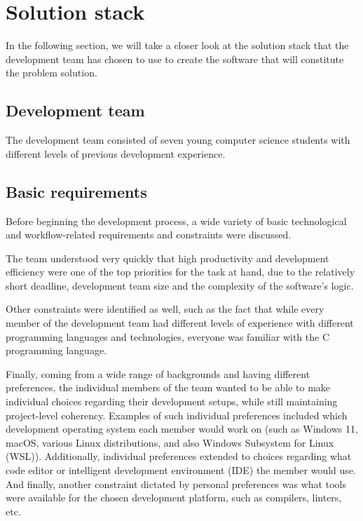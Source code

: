 \section{Solution stack}\label{sec:solution-stack}

In the following section, we will take a closer look at the solution stack that the development team has chosen to use
to create the software that will constitute the problem solution.

\subsection{Development team}\label{subsec:development-team}

The development team consisted of seven young computer science students with different levels of previous development
experience.

\subsection{Basic requirements}\label{subsec:basic-requirements}

Before beginning the development process, a wide variety of basic technological and workflow-related
requirements and constraints were discussed.

The team understood very quickly that high productivity and development efficiency were one of the top priorities for
the task at hand, due to the relatively short deadline, development team size and the complexity of the software's
logic.

Other constraints were identified as well, such as the fact that while every member of the development team had
different levels of experience with different programming languages and technologies, everyone was familiar with the
C programming language.

Finally, coming from a wide range of backgrounds and having different preferences, the individual members of the team
wanted to be able to make individual choices regarding their development setups, while still maintaining project-level
coherency.
Examples of such individual preferences included which development operating system each member would work on (such as
Windows 11, macOS, various Linux distributions, and also Windows Subsystem for Linux (WSL)).
Additionally, individual preferences extended to choices regarding what code editor or intelligent development
environment (IDE) the member would use.
And finally, another constraint dictated by personal preferences was what tools were available for the chosen
development platform, such as compilers, linters, etc.

